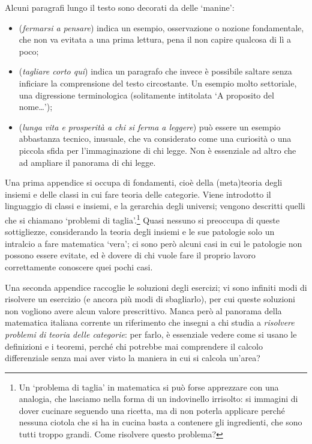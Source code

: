 Alcuni paragrafi lungo il testo sono decorati da delle `manine':
\begin{itemize}
	\item {} (\emph{fermarsi a pensare}) indica un esempio, osservazione o nozione fondamentale, che non va evitata a una prima lettura, pena il non capire qualcosa di lì a poco;
	\item {} (\emph{tagliare corto qui}) indica un paragrafo che invece è possibile saltare senza inficiare la comprensione del testo circostante. Un esempio molto settoriale, una digressione terminologica (solitamente intitolata `A proposito del nome\dots');
	\item {} (\emph{lunga vita e prosperità a chi si ferma a leggere}) può essere un esempio abbastanza tecnico, inusuale, che va considerato come una curiosità o una piccola sfida per l'immaginazione di chi legge. Non è essenziale ad altro che ad ampliare il panorama di chi legge.
\end{itemize}
Una prima appendice si occupa di fondamenti, cioè della (meta)teoria degli insiemi e delle classi in cui fare teoria delle categorie. Viene introdotto il linguaggio di classi e insiemi, e la gerarchia degli universi; vengono descritti quelli che si chiamano `problemi di taglia'.\footnote{Un `problema di taglia' in matematica si può forse apprezzare con una analogia, che lasciamo nella forma di un indovinello irrisolto: si immagini di dover cucinare seguendo una ricetta, ma di non poterla applicare perché nessuna ciotola che si ha in cucina basta a contenere gli ingredienti, che sono tutti troppo grandi. Come risolvere questo problema?} Quasi nessuno si preoccupa di queste sottigliezze, considerando la teoria degli insiemi e le sue patologie solo un intralcio a fare matematica `vera'; ci sono però alcuni casi in cui le patologie non possono essere evitate, ed è dovere di chi vuole fare il proprio lavoro correttamente conoscere quei pochi casi.

Una seconda appendice raccoglie le soluzioni degli esercizi; vi sono infiniti modi di risolvere un esercizio (e ancora più modi di sbagliarlo), per cui queste soluzioni non vogliono avere alcun valore prescrittivo. Manca però al panorama della matematica italiana corrente un riferimento che insegni a chi studia a \emph{risolvere problemi di teoria delle categorie}: per farlo, è essenziale vedere come si usano le definizioni e i teoremi, perché chi potrebbe mai comprendere il calcolo differenziale senza mai aver visto la maniera in cui si calcola un'area?

